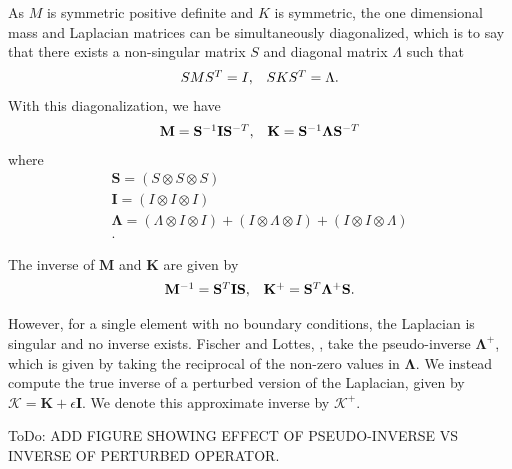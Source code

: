 As $M$ is symmetric positive definite and $K$ is symmetric, the one dimensional mass and Laplacian matrices can be simultaneously diagonalized, which is to say that there exists a non-singular matrix $S$ and diagonal matrix $\Lambda$ such that
\begin{equation}
\begin{array}{c c}
S M S^T = I,  &  S K S^T = \Lambda.
\end{array}
\end{equation}
With this diagonalization, we have
\begin{equation}
\begin{array}{c c}
\mathbf{M}   = \mathbf{S}^{-1} \mathbf{I} \mathbf{S}^{-T},  &  \mathbf{K} = \mathbf{S}^{-1} \mathbf{\Lambda} \mathbf{S}^{-T}  \\
\end{array}
\end{equation}
where
\begin{equation}
\begin{array}{c}
\mathbf{S}       = \left( S \otimes S \otimes S \right)  \\
\mathbf{I}       = \left( I \otimes I \otimes I \right)  \\
\mathbf{\Lambda} = \left( \Lambda \otimes I \otimes I \right) + \left( I \otimes \Lambda \otimes I \right) + \left( I \otimes I \otimes \Lambda \right)  \\.
\end{array}
\end{equation}

The inverse of $\mathbf{M}$ and $\mathbf{K}$ are given by
\begin{equation}
\begin{array}{c c}
\mathbf{M}^{-1} = \mathbf{S}^T \mathbf{I} \mathbf{S},  &  \mathbf{K}^{+} = \mathbf{S}^T \mathbf{\Lambda}^{+} \mathbf{S}.
\end{array}
\end{equation}

However, for a single element with no boundary conditions, the Laplacian is singular and no inverse exists.
Fischer and Lottes, \cite{fischer2005hybrid}, take the pseudo-inverse $\mathbf{\Lambda}^{+}$, which is given by taking the reciprocal of the non-zero values in $\mathbf{\Lambda}$.
We instead compute the true inverse of a perturbed version of the Laplacian, given by $\mathcal{K} = \mathbf{K} + \epsilon \mathbf{I}$.
We denote this approximate inverse by $\mathcal{K}^+$.

ToDo: ADD FIGURE SHOWING EFFECT OF PSEUDO-INVERSE VS INVERSE OF PERTURBED OPERATOR.

